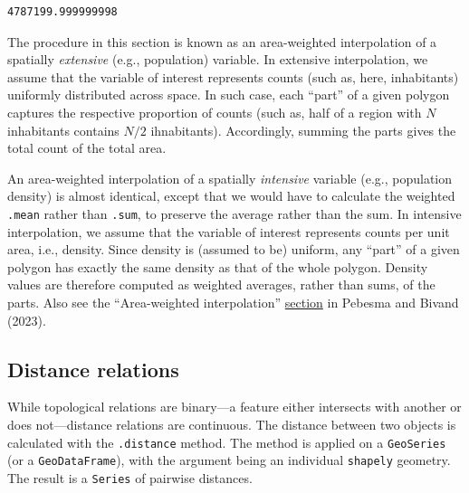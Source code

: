 \documentclass[
  letterpaper,
]{krantz}
\begin{document}
\begin{verbatim}
4787199.999999998
\end{verbatim}

The procedure in this section is known as an area-weighted interpolation
of a spatially \emph{extensive} (e.g., population) variable. In
extensive interpolation, we assume that the variable of interest
represents counts (such as, here, inhabitants) uniformly distributed
across space. In such case, each ``part'' of a given polygon captures
the respective proportion of counts (such as, half of a region with
\(N\) inhabitants contains \(N/2\) ihnabitants). Accordingly, summing
the parts gives the total count of the total area.

An area-weighted interpolation of a spatially \emph{intensive} variable
(e.g., population density) is almost identical, except that we would
have to calculate the weighted \texttt{.mean} rather than \texttt{.sum},
to preserve the average rather than the sum. In intensive interpolation,
we assume that the variable of interest represents counts per unit area,
i.e., density. Since density is (assumed to be) uniform, any ``part'' of
a given polygon has exactly the same density as that of the whole
polygon. Density values are therefore computed as weighted averages,
rather than sums, of the parts. Also see the ``Area-weighted
interpolation''
\href{https://r-spatial.org/book/05-Attributes.html\#sec-area-weighted}{section}
in Pebesma and Bivand (2023).

\subsection{Distance relations}\label{sec-distance-relations}

While topological relations are binary---a feature either intersects
with another or does not---distance relations are continuous. The
distance between two objects is calculated with the \texttt{.distance}
method. The method is applied on a \texttt{GeoSeries} (or a
\texttt{GeoDataFrame}), with the argument being an individual
\texttt{shapely} geometry. The result is a \texttt{Series} of pairwise
distances.
\end{document}
